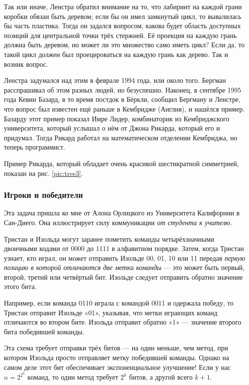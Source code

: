 Так или иначе, Ленстра обратил внимание на то, что лабиринт на каждой грани коробки обязан быть деревом;
если бы он имел замкнутый цикл, то вывалилась бы часть пластика.
Тогда он задался вопросом, какова будет область доступных позиций для центральной точки трёх стержней.
Её проекция на каждую грань должна быть деревом, но может ли это множество само иметь цикл?
Если да, то такой цикл должен был проецироваться на каждую грань как дерево.
Так и возник вопрос.

Ленстра задумался над этим в феврале 1994 года, или около того.
Бергман расспрашивал об этом разных людей, но безуспешно.
Наконец, в сентябре 1995 года Кевин Базард, в то время постдок в Бёркли, сообщил Бергману и Ленстре, что вопрос был известен ещё раньше в Кембридже (Англия), и нашёлся пример.
Базарду этот пример показал Имре Лидер, комбинаторик из Кембриджского университета, который услышал о нём от Джона Рикарда, который его и придумал.
Тогда Рикард работал на математическом отделении Кембриджа, но теперь программист.

Пример Рикарда, который обладает очень красивой шестикратной симметрией, показан на рис. \ref{pic:tree3}.

\subsubsection*{Игроки и победители}

Эта задача пришла ко мне от Алона Орлицкого из Университета Калифорнии в Сан-Диего.
Она иллюстрирует силу коммуникации \emph{от студента к учителю}.

Тристан и Изольда могут заранее пометить команды четырёхзначными двоичными кодами от 0000 до 1111 в алфавитном порядке.
Затем, когда Тристан узнает, кто играл, он может отправить Изольде 00, 01, 10 или 11 передав \emph{первую позицию в которой отличаются две метки команды} --- это может быть первый, второй, третий или четвёртый бит.
Изольде следует отправить обратно значение этого бита.

Например, если команда 0110 играла с командой 0011 и одержала победу,
то Тристан отправит Изольде «01», указывая, что метки играющих команд отличаются во втором бите.
Изольда отправит обратно «1» --- значение второго бита победившей команды.

Эта схема требует отправки трёх битов --- на один меньше, чем метод, при котором Изольда просто отправляет метку победившей команды.
Однако на самом деле этот бит обеспечивает экспоненциальное улучшение!
Если у нас $n = 2^{2^k}$ команд, то один метод требует $2^k$ битов, а другой всего $k + 1$.


